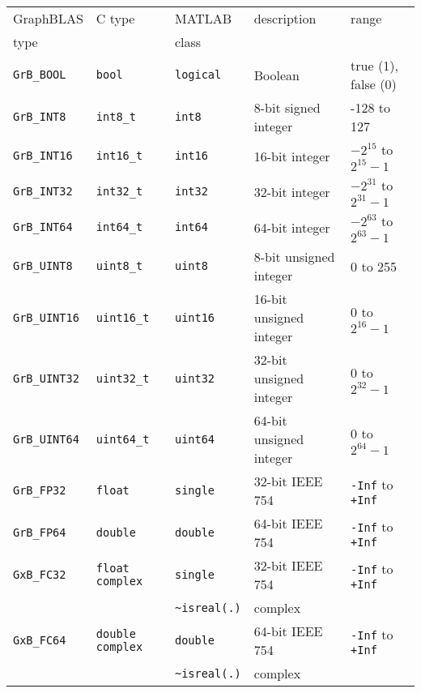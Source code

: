 \documentclass[12pt]{article}
\begin{document}
\vspace{0.2in}
\noindent
{\footnotesize
\begin{tabular}{lllll}
\hline
GraphBLAS         & C type           & MATLAB         & description              & range \\
type              &                  & class          &                          & \\
\hline
\verb'GrB_BOOL'   & \verb'bool'      & \verb'logical' & Boolean                  & true (1), false (0) \\
\hline
\verb'GrB_INT8'   & \verb'int8_t'    & \verb'int8'    & 8-bit signed integer     & -128 to 127 \\
\verb'GrB_INT16'  & \verb'int16_t'   & \verb'int16'   & 16-bit integer           & $-2^{15}$ to $2^{15}-1$ \\
\verb'GrB_INT32'  & \verb'int32_t'   & \verb'int32'   & 32-bit integer           & $-2^{31}$ to $2^{31}-1$ \\
\verb'GrB_INT64'  & \verb'int64_t'   & \verb'int64'   & 64-bit integer           & $-2^{63}$ to $2^{63}-1$ \\
\hline
\verb'GrB_UINT8'  & \verb'uint8_t'   & \verb'uint8'   & 8-bit unsigned integer   & 0 to 255 \\
\verb'GrB_UINT16' & \verb'uint16_t'  & \verb'uint16'  & 16-bit unsigned integer  & 0 to $2^{16}-1$ \\
\verb'GrB_UINT32' & \verb'uint32_t'  & \verb'uint32'  & 32-bit unsigned integer  & 0 to $2^{32}-1$ \\
\verb'GrB_UINT64' & \verb'uint64_t'  & \verb'uint64'  & 64-bit unsigned integer  & 0 to $2^{64}-1$ \\
\hline
\verb'GrB_FP32'   & \verb'float'     & \verb'single'  & 32-bit IEEE 754          & \verb'-Inf' to \verb'+Inf'\\
\verb'GrB_FP64'   & \verb'double'    & \verb'double'  & 64-bit IEEE 754          & \verb'-Inf' to \verb'+Inf'\\
\hline
\verb'GxB_FC32'   & \verb'float complex'  & \verb'single'      & 32-bit IEEE 754  & \verb'-Inf' to \verb'+Inf'\\
                  &                       & \verb'~isreal(.)'  & complex          &                           \\
\hline
\verb'GxB_FC64'   & \verb'double complex' & \verb'double'      & 64-bit IEEE 754  & \verb'-Inf' to \verb'+Inf'\\
                  &                       & \verb'~isreal(.)'  & complex          &                           \\
\hline
\end{tabular}
}
\vspace{0.2in}
\end{document}

